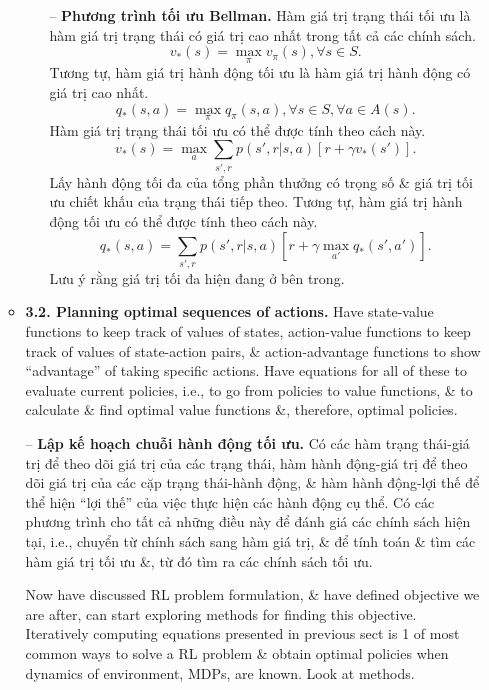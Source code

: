 \documentclass{article}
\begin{document}
\begin{itemize}
\begin{itemize}
\begin{itemize}
            -- {\bf Phương trình tối ưu Bellman.} Hàm giá trị trạng thái tối ưu là hàm giá trị trạng thái có giá trị cao nhất trong tất cả các chính sách.
            \begin{equation*}
                v_*(s) = \max_\pi v_\pi(s), \forall s\in S.
            \end{equation*}
            Tương tự, hàm giá trị hành động tối ưu là hàm giá trị hành động có giá trị cao nhất.
            \begin{equation*}
                q_*(s,a) = \max_\pi q_\pi(s,a), \forall s\in S, \forall a\in A(s).
            \end{equation*}
            Hàm giá trị trạng thái tối ưu có thể được tính theo cách này.
            \begin{equation*}
                v_*(s) = \max_a\sum_{s',r} p(s',r|s,a)[r + \gamma v_*(s')].
            \end{equation*}
            Lấy hành động tối đa của tổng phần thưởng có trọng số \& giá trị tối ưu chiết khấu của trạng thái tiếp theo. Tương tự, hàm giá trị hành động tối ưu có thể được tính theo cách này.
            \begin{equation*}
                q_*(s,a) = \sum_{s',r} p(s',r|s,a)[r + \gamma\max_{a'} q_*(s',a')].
            \end{equation*}
            Lưu ý rằng giá trị tối đa hiện đang ở bên trong.
        \end{itemize}
        \item {\bf3.2. Planning optimal sequences of actions.} Have state-value functions to keep track of values of states, action-value functions to keep track of values of state-action pairs, \& action-advantage functions to show ``advantage'' of taking specific actions. Have equations for all of these to evaluate current policies, i.e., to go from policies to value functions, \& to calculate \& find optimal value functions \&, therefore, optimal policies.

        -- {\bf Lập kế hoạch chuỗi hành động tối ưu.} Có các hàm trạng thái-giá trị để theo dõi giá trị của các trạng thái, hàm hành động-giá trị để theo dõi giá trị của các cặp trạng thái-hành động, \& hàm hành động-lợi thế để thể hiện ``lợi thế'' của việc thực hiện các hành động cụ thể. Có các phương trình cho tất cả những điều này để đánh giá các chính sách hiện tại, i.e., chuyển từ chính sách sang hàm giá trị, \& để tính toán \& tìm các hàm giá trị tối ưu \&, từ đó tìm ra các chính sách tối ưu.

        Now have discussed RL problem formulation, \& have defined objective we are after, can start exploring methods for finding this objective. Iteratively computing equations presented in previous sect is 1 of most common ways to solve a RL problem \& obtain optimal policies when dynamics of environment, MDPs, are known. Look at methods.


\end{itemize}
\end{itemize}
\end{document}
